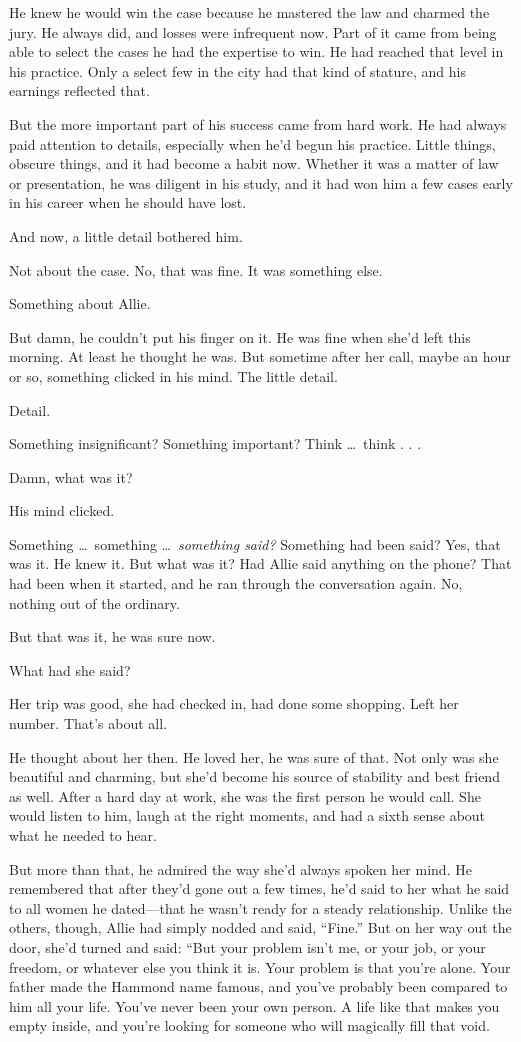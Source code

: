 \documentclass[10pt, twoside, openright]{book}
\begin{document}
He knew he would win the case because he mastered the law and charmed
the jury. He always did, and losses were infrequent now. Part of it came
from being able to select the cases he had the expertise to win. He had
reached that level in his practice. Only a select few in the city had
that kind of stature, and his earnings reflected that.

But the more important part of his success came from hard work. He had
always paid attention to details, especially when he'd begun his
practice. Little things, obscure things, and it had become a habit now.
Whether it was a matter of law or presentation, he was diligent in his
study, and it had won him a few cases early in his career when he should
have lost.


And now, a little detail bothered him.

Not about the case. No, that was fine. It was something else.

Something about Allie.


But damn, he couldn't put his finger on it. He was fine when she'd left
this morning. At least he thought he was. But sometime after her call,
maybe an hour or so, something clicked in his mind. The little detail.


Detail.

Something insignificant? Something important? Think   \dots\ think . . .


Damn, what was it?


His mind clicked.


Something   \dots\ something   \dots\ \emph{something said?} Something had
been said? Yes, that was it. He knew it. But what was it? Had Allie said
anything on the phone? That had been when it started, and he ran through
the conversation again. No, nothing out of the ordinary.


But that was it, he was sure now.

What had she said?


Her trip was good, she had checked in, had done some shopping. Left her
number. That's about all.

He thought about her then. He loved her, he was sure of that. Not only
was she beautiful and charming, but she'd become his source of stability
and best friend as well. After a hard day at work, she was the first
person he would call. She would listen to him, laugh at the right
moments, and had a sixth sense about what he needed to hear.

But more than that, he admired the way she'd always spoken her mind. He
remembered that after they'd gone out a few times, he'd said to her what
he said to all women he dated---that he wasn't ready for a steady
relationship. Unlike the others, though, Allie had simply nodded and
said, ``Fine.'' But on her way out the door, she'd turned and said:
``But your problem isn't me, or your job, or your freedom, or whatever
else you think it is. Your problem is that you're alone. Your father
made the Hammond name famous, and you've probably been compared to him
all your life. You've never been your own person. A life like that makes
you empty inside, and you're looking for someone who will magically fill
that void.
\end{document}
